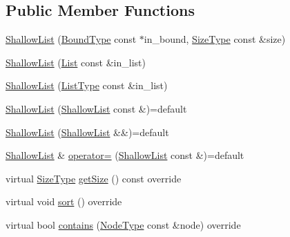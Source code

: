 \subsection*{Public Member Functions}
\begin{DoxyCompactItemize}
\item 
\hyperlink{structvt_1_1group_1_1region_1_1_shallow_list_a603d4964e6b51c9883b3f7ef1f7de997}{Shallow\+List} (\hyperlink{structvt_1_1group_1_1region_1_1_region_abf426ff85bed72c1c6524fad6a9f1751}{Bound\+Type} const $\ast$in\+\_\+bound, \hyperlink{structvt_1_1group_1_1region_1_1_region_a9bb381adf31111aae34dbc644bad6c1f}{Size\+Type} const \&size)
\item 
\hyperlink{structvt_1_1group_1_1region_1_1_shallow_list_a205b74129dffd8801bb6ad62614850bf}{Shallow\+List} (\hyperlink{structvt_1_1group_1_1region_1_1_list}{List} const \&in\+\_\+list)
\item 
\hyperlink{structvt_1_1group_1_1region_1_1_shallow_list_a119c08f1cd40f828b431716efe5d523f}{Shallow\+List} (\hyperlink{structvt_1_1group_1_1region_1_1_region_a4e35b2fc6dca06aca0b7bc0e19b35c5a}{List\+Type} const \&in\+\_\+list)
\item 
\hyperlink{structvt_1_1group_1_1region_1_1_shallow_list_a96d19964af287a2807f427fe6f797624}{Shallow\+List} (\hyperlink{structvt_1_1group_1_1region_1_1_shallow_list}{Shallow\+List} const \&)=default
\item 
\hyperlink{structvt_1_1group_1_1region_1_1_shallow_list_a0a68f0b14cc8bb90b1e2a82e4a686c9a}{Shallow\+List} (\hyperlink{structvt_1_1group_1_1region_1_1_shallow_list}{Shallow\+List} \&\&)=default
\item 
\hyperlink{structvt_1_1group_1_1region_1_1_shallow_list}{Shallow\+List} \& \hyperlink{structvt_1_1group_1_1region_1_1_shallow_list_adf75a4dbf01b1847ccc015a98fc490f0}{operator=} (\hyperlink{structvt_1_1group_1_1region_1_1_shallow_list}{Shallow\+List} const \&)=default
\item 
virtual \hyperlink{structvt_1_1group_1_1region_1_1_region_a9bb381adf31111aae34dbc644bad6c1f}{Size\+Type} \hyperlink{structvt_1_1group_1_1region_1_1_shallow_list_a6b8fe82607fdcf88ac33ad387192fbb2}{get\+Size} () const override
\item 
virtual void \hyperlink{structvt_1_1group_1_1region_1_1_shallow_list_a1c2ba4da8b89771a0361ff34763d7f62}{sort} () override
\item 
virtual bool \hyperlink{structvt_1_1group_1_1region_1_1_shallow_list_a58313e5cab61f196ff5fb1d6ac109d1c}{contains} (\hyperlink{namespacevt_a866da9d0efc19c0a1ce79e9e492f47e2}{Node\+Type} const \&node) override

\end{DoxyCompactItemize}
